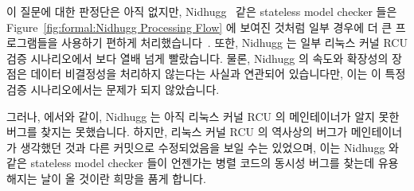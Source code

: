이 질문에 대한 판정단은 아직 없지만, Nidhugg~\cite{CarlLeonardsson2014Nidhugg}
같은 stateless model checker 들은
Figure~\ref{fig:formal:Nidhugg Processing Flow} 에 보여진 것처럼
일부 경우에 더 큰 프로그램들을 사용하기 편하게 처리했습니다~\cite{SMC-TreeRCU}.
또한, Nidhugg 는 일부 리눅스 커널 RCU 검증 시나리오에서  보다 열배
넘게 빨랐습니다.
물론, Nidhugg 의 속도와 확장성의 장점은 데이터 비결정성을 처리하지 않는다는
사실과 연관되어 있습니다만, 이는 이 특정 검증 시나리오에서는 문제가 되지
않았습니다.

그러나,  에서와 같이, Nidhugg 는 아직 리눅스 커널 RCU 의 메인테이너가
알지 못한 버그를 찾지는 못했습니다.
하지만, 리눅스 커널 RCU 의 역사상의 버그가 메인테이너가 생각했던 것과 다른
커밋으로 수정되었음을 보일 수는 있었으며, 이는 Nidhugg 와 같은 stateless model
checker 들이 언젠가는 병렬 코드의 동시성 버그를 찾는데 유용해지는 날이 올
것이란 희망을 품게 합니다.

